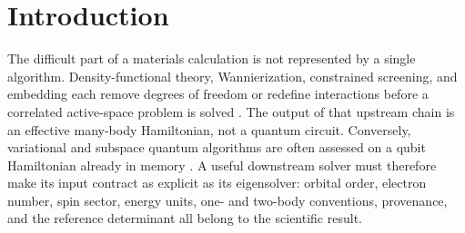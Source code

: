 \documentclass[aps,pra,reprint,superscriptaddress,nofootinbib,floatfix]{revtex4-2}
\begin{document}
\begin{abstract}
generators are admitted, and the same extension provides no improvement on
$2\times3$.
For response, one qubit-wise-commuting measurement cache reconstructs
$(S,H,Q)$, and a grouped bootstrap reruns thresholding, diagonalization, root
matching, spectral weights, susceptibility, and broadening.  The resulting
percentile bands are explicitly heuristic, pointwise, and conditional on
replicas that preserve rank and root identity; they are not finite-sample
confidence certificates.  Holding system, observable, words, groups, shots,
basis size, and seeds fixed and varying only the generator family, acceptance
falls from $200/200$ at $\kappa_S\approx1$ to $137/200$ at
$\kappa_S=9.3\times10^{3}$, with every rejection a moved thresholded rank.
The work establishes an executable and
independently checked path from an interchange Hamiltonian to energies,
correlations, and response.  It does not establish materials accuracy,
favorable scaling, or a quantum advantage.
\end{abstract}

\maketitle

\section{Introduction}
\label{sec:introduction}

The difficult part of a materials calculation is not represented by a single
algorithm.  Density-functional theory, Wannierization, constrained screening,
and embedding each remove degrees of freedom or redefine interactions before
a correlated active-space problem is solved
\cite{marzari2012wannier,pizzi2020wannier90,aryasetiawan2004crpa,georges1996dmft}.
The output of that upstream chain is an effective many-body Hamiltonian, not a
quantum circuit.  Conversely, variational and subspace quantum algorithms are
often assessed on a qubit Hamiltonian already in memory
\cite{peruzzo2014vqe,mcclean2017qse,huggins2020nonorthogonal}.  A useful
downstream solver must therefore make its input contract as explicit as its
eigensolver: orbital order, electron number, spin sector, energy units,
one- and two-body conventions, provenance, and the reference determinant all
belong to the scientific result.
\end{document}

